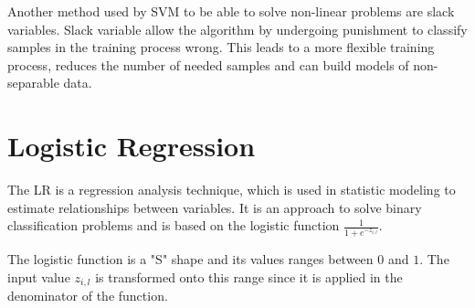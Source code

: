 Another method used by \ac{SVM} to be able to solve non-linear problems are slack variables.
Slack variable allow the algorithm by undergoing punishment to classify samples in the training process wrong. %
This leads to a more flexible training process, reduces the number of needed samples and can build models of non-separable data.



\section{Logistic Regression}
\label{sec:lr}

The \acf{LR} is a regression analysis technique, which is used in statistic modeling to estimate relationships between variables. %
It is an approach to solve binary classification problems and is based on the logistic function $\frac{1}{1 + e^{-z_{i,l}}}$.

The logistic function is a "S" shape and its values ranges between $0$ and $1$.
The input value $z_{i,l}$ is transformed onto this range since it is applied in the denominator of the function. %

